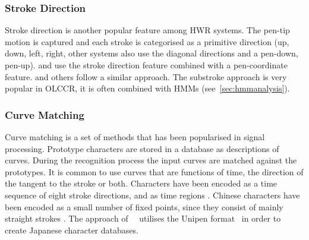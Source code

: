 \subsubsection{Stroke Direction}
\label{sec:strokedirection}
Stroke direction is another popular feature among HWR systems. The pen-tip motion
is captured and each stroke is categorised as a primitive direction (up, down, 
left, right, other systems also use the diagonal directions and a pen-down, 
pen-up).  and  use the stroke 
direction feature combined with a pen-coordinate feature. 
 and others follow a similar approach. The substroke 
approach is very popular in OLCCR, it is often combined with HMMs 
(see~\ref{sec:hmmanalysis}).

\subsubsection{Curve Matching}
\label{sec:curvematching}

Curve matching is a set of methods that has been popularised in signal 
processing. Prototype characters are stored in a database as descriptions 
of curves. During the recognition process the input curves are matched against 
the prototypes. It is common to use curves that are functions of time, 
the direction of the tangent to the stroke or both. Characters have been 
encoded as a time sequence of eight stroke directions, and as time 
regions . Chinese characters have been encoded as a 
small number of fixed points, since they consist of mainly straight strokes 
. The approach 
of~~\citeyear{Jaeger2001a} utilises the Unipen 
format~ in order to create Japanese character 
databases.

